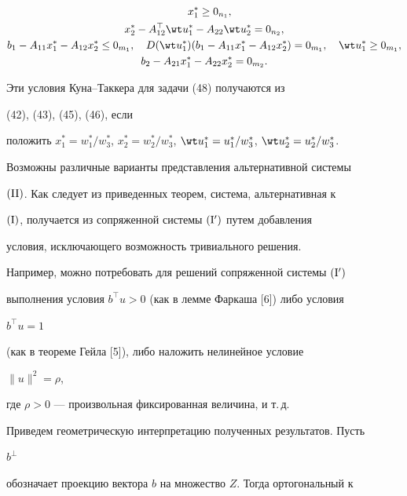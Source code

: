 \begin{pf}
\begin{gather*}
\quad x^*_1\ge0_{n_1}, \\


%


x^*_2-A^\top_{12}\wt u^*_1-A_{22}\wt u^*_2=0_{n_2},\\


%


b_1-A_{11}x^*_1-A_{12}x^*_2\le0_{m_1},\quad


D(\wt u^*_1)(b_1-A_{11}x^*_1-A_{12}x^*_2)=0_{m_1},\quad


\wt u^*_1\ge0_{m_1},\\


%


b_2-A_{21}x^*_1-A_{22}x^*_2=0_{m_2}.


\end{gather*}


Эти условия Куна--Таккера для задачи (48) получаются из


(42), (43), (45), (46), если


положить $x^*_1=w^*_1/w^*_3$, $x^*_2=w^*_2/w^*_3$, $\wt 


u^*_1=u^*_1/w^*_3$, $\wt u^*_2=u^*_2/w^*_3$.


\end{pf}





Возможны различные варианты представления альтернативной системы


$(\mathrm{II})$. Как следует из приведенных теорем, система, альтернативная к


$(\mathrm I)$, получается из сопряженной системы $(\mathrm I ')$ путем добавления


условия, исключающего возможность тривиального решения.


Например, можно потребовать для решений сопряженной системы $(\mathrm I ')$


выполнения условия $b^\top u>0$ (как в лемме Фаркаша [6]) либо условия 


$b^\top u=1$


(как в теореме Гейла [5]), либо наложить нелинейное условие 


$\|u\|^2=\rho$,


где $\rho>0$ --- произвольная фиксированная величина, и т.\,д.





Приведем геометрическую интерпретацию полученных результатов. Пусть 


$b^\bot$


обозначает проекцию вектора $b$ на множество $Z$. Тогда ортогональный к 


